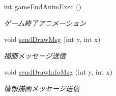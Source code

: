 \begin{DoxyCompactItemize}
int \hyperlink{class_reversi4color_wpf_1_1_reversi_play_a11c4713ab8ff3fde4ebf7b0ab6cc7ed3}{game\+End\+Anim\+Exec} ()
\begin{DoxyCompactList}\small\item\em ゲーム終了アニメーション \end{DoxyCompactList}\item 
void \hyperlink{class_reversi4color_wpf_1_1_reversi_play_a31094f14117da5411e4616e7935ff67b}{send\+Draw\+Msg} (int y, int x)
\begin{DoxyCompactList}\small\item\em 描画メッセージ送信 \end{DoxyCompactList}\item 
void \hyperlink{class_reversi4color_wpf_1_1_reversi_play_a503f1a56ac7547ebfb347c31ff5b7e15}{send\+Draw\+Info\+Msg} (int y, int x)
\begin{DoxyCompactList}\small\item\em 情報描画メッセージ送信 \end{DoxyCompactList}\end{DoxyCompactItemize}
